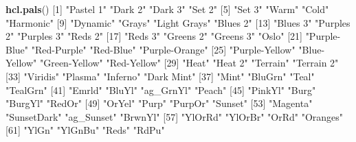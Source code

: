 \documentclass[
]{book}
\newenvironment{Shaded}{\begin{snugshade}}{\end{snugshade}}
\newcommand{\DecValTok}[1]{\textcolor[rgb]{0.00,0.00,0.81}{#1}}
\newcommand{\KeywordTok}[1]{\textcolor[rgb]{0.13,0.29,0.53}{\textbf{#1}}}
\newcommand{\NormalTok}[1]{#1}
\newcommand{\StringTok}[1]{\textcolor[rgb]{0.31,0.60,0.02}{#1}}
\begin{document}
\begin{Shaded}
\begin{Highlighting}[]
\KeywordTok{hcl.pals}\NormalTok{()}
\NormalTok{  [}\DecValTok{1}\NormalTok{] }\StringTok{"Pastel 1"}      \StringTok{"Dark 2"}        \StringTok{"Dark 3"}        \StringTok{"Set 2"}        
\NormalTok{  [}\DecValTok{5}\NormalTok{] }\StringTok{"Set 3"}         \StringTok{"Warm"}          \StringTok{"Cold"}          \StringTok{"Harmonic"}     
\NormalTok{  [}\DecValTok{9}\NormalTok{] }\StringTok{"Dynamic"}       \StringTok{"Grays"}         \StringTok{"Light Grays"}   \StringTok{"Blues 2"}      
\NormalTok{ [}\DecValTok{13}\NormalTok{] }\StringTok{"Blues 3"}       \StringTok{"Purples 2"}     \StringTok{"Purples 3"}     \StringTok{"Reds 2"}       
\NormalTok{ [}\DecValTok{17}\NormalTok{] }\StringTok{"Reds 3"}        \StringTok{"Greens 2"}      \StringTok{"Greens 3"}      \StringTok{"Oslo"}         
\NormalTok{ [}\DecValTok{21}\NormalTok{] }\StringTok{"Purple-Blue"}   \StringTok{"Red-Purple"}    \StringTok{"Red-Blue"}      \StringTok{"Purple-Orange"}
\NormalTok{ [}\DecValTok{25}\NormalTok{] }\StringTok{"Purple-Yellow"} \StringTok{"Blue-Yellow"}   \StringTok{"Green-Yellow"}  \StringTok{"Red-Yellow"}   
\NormalTok{ [}\DecValTok{29}\NormalTok{] }\StringTok{"Heat"}          \StringTok{"Heat 2"}        \StringTok{"Terrain"}       \StringTok{"Terrain 2"}    
\NormalTok{ [}\DecValTok{33}\NormalTok{] }\StringTok{"Viridis"}       \StringTok{"Plasma"}        \StringTok{"Inferno"}       \StringTok{"Dark Mint"}    
\NormalTok{ [}\DecValTok{37}\NormalTok{] }\StringTok{"Mint"}          \StringTok{"BluGrn"}        \StringTok{"Teal"}          \StringTok{"TealGrn"}      
\NormalTok{ [}\DecValTok{41}\NormalTok{] }\StringTok{"Emrld"}         \StringTok{"BluYl"}         \StringTok{"ag_GrnYl"}      \StringTok{"Peach"}        
\NormalTok{ [}\DecValTok{45}\NormalTok{] }\StringTok{"PinkYl"}        \StringTok{"Burg"}          \StringTok{"BurgYl"}        \StringTok{"RedOr"}        
\NormalTok{ [}\DecValTok{49}\NormalTok{] }\StringTok{"OrYel"}         \StringTok{"Purp"}          \StringTok{"PurpOr"}        \StringTok{"Sunset"}       
\NormalTok{ [}\DecValTok{53}\NormalTok{] }\StringTok{"Magenta"}       \StringTok{"SunsetDark"}    \StringTok{"ag_Sunset"}     \StringTok{"BrwnYl"}       
\NormalTok{ [}\DecValTok{57}\NormalTok{] }\StringTok{"YlOrRd"}        \StringTok{"YlOrBr"}        \StringTok{"OrRd"}          \StringTok{"Oranges"}      
\NormalTok{ [}\DecValTok{61}\NormalTok{] }\StringTok{"YlGn"}          \StringTok{"YlGnBu"}        \StringTok{"Reds"}          \StringTok{"RdPu"}         

\end{Highlighting}
\end{Shaded}
\end{document}
